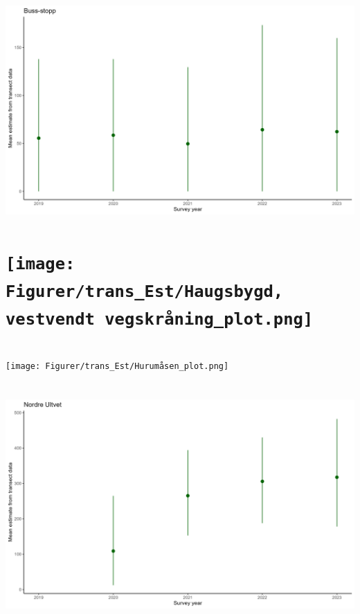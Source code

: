 \documentclass[
  letterpaper,
  DIV=11,
  numbers=noendperiod]{scrreport}
\begin{document}

\hypertarget{section-2}{%
\chapter{\texorpdfstring{\protect\includegraphics{Figurer/trans_Est/Buss-stopp_plot.png}}{}}\label{section-2}}


\hypertarget{section-3}{%
\chapter{\texorpdfstring{\protect\texttt{[image: Figurer/trans\_Est/Haugsbygd, vestvendt vegskråning\_plot.png]}}{}}\label{section-3}}


\hypertarget{section-4}{%
\chapter{}\label{section-4}}

\texttt{[image: Figurer/trans\_Est/Hurumåsen\_plot.png]}


\hypertarget{section-5}{%
\chapter{\texorpdfstring{\protect\includegraphics{Figurer/trans_Est/Nordre Ultvet_plot.png}}{}}\label{section-5}}
\end{document}
